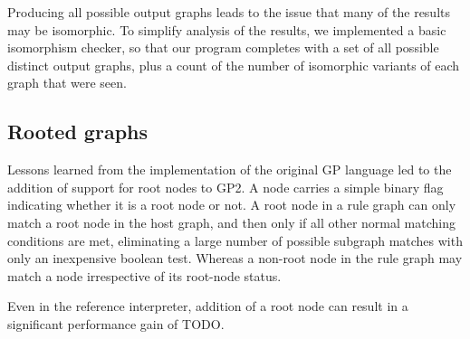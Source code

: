 Producing all possible output graphs leads to the issue that many of the results may be isomorphic. To simplify analysis of the results, we implemented a basic isomorphism checker, so that our program completes with a set of all possible distinct output graphs, plus a count of the number of isomorphic variants of each graph that were seen.


\subsection{Rooted graphs}

Lessons learned from the implementation of the original GP language led to the addition of support for root nodes to GP2. A node carries a simple binary flag indicating whether it is a root node or not. A root node in a rule graph can only match a root node in the host graph, and then only if all other normal matching conditions are met, eliminating a large number of possible subgraph matches with only an inexpensive boolean test. Whereas a non-root node in the rule graph may match a node irrespective of its root-node status.


Even in the reference interpreter, addition of a root node can result in a significant performance gain of TODO.

